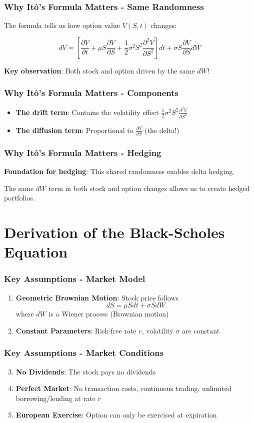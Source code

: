 \documentclass[aspectratio=169]{beamer}
\begin{document}
\begin{frame}
\frametitle{Why Itô's Formula Matters - Same Randomness}
The formula tells us how option value \(V(S,t)\) changes:

\[dV = \left[\frac{\partial V}{\partial t} + \mu S \frac{\partial V}{\partial S} + \frac{1}{2}\sigma^2 S^2 \frac{\partial^2 V}{\partial S^2}\right] dt + \sigma S \frac{\partial V}{\partial S} dW\]

\textbf{Key observation}: Both stock and option driven by the same \(dW\)!
\end{frame}

\begin{frame}
\frametitle{Why Itô's Formula Matters - Components}
\begin{itemize}
\item \textbf{The drift term}: Contains the volatility effect \(\frac{1}{2}\sigma^2 S^2 \frac{\partial^2 V}{\partial S^2}\)
\item \textbf{The diffusion term}: Proportional to \(\frac{\partial V}{\partial S}\) (the delta!)
\end{itemize}
\end{frame}

\begin{frame}
\frametitle{Why Itô's Formula Matters - Hedging}
\textbf{Foundation for hedging}: This shared randomness enables delta hedging.

The same \(dW\) term in both stock and option changes allows us to create hedged portfolios.
\end{frame}

\section{Derivation of the Black-Scholes Equation}

\begin{frame}
\frametitle{Key Assumptions - Market Model}
\begin{enumerate}
\item \textbf{Geometric Brownian Motion}: Stock price follows
\[dS = \mu S dt + \sigma S dW\]
where \(dW\) is a Wiener process (Brownian motion)

\item \textbf{Constant Parameters}: Risk-free rate \(r\), volatility \(\sigma\) are constant
\end{enumerate}
\end{frame}

\begin{frame}
\frametitle{Key Assumptions - Market Conditions}
\begin{enumerate}
\setcounter{enumi}{2}
\item \textbf{No Dividends}: The stock pays no dividends

\item \textbf{Perfect Market}: No transaction costs, continuous trading, unlimited borrowing/lending at rate \(r\)

\item \textbf{European Exercise}: Option can only be exercised at expiration
\end{enumerate}
\end{frame}
\end{document}
